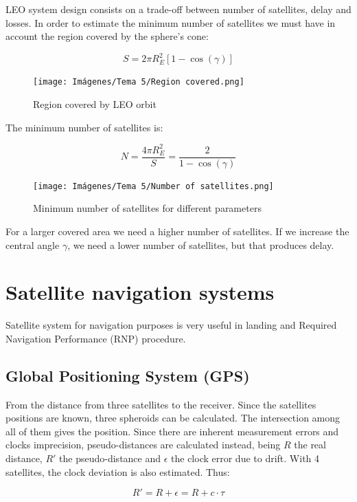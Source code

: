 \documentclass[
	12pt,
	twoside
]{book}
\begin{document}
LEO system design consists on a trade-off between number of satellites, delay and losses. In order to estimate the minimum number of satellites we must have in account the region covered by the sphere’s cone:

$$
	S = 2 \pi R_{E}^2 \left[ 1 - \cos(\gamma) \right]
$$

\begin{figure}[H]
	\centering
	\texttt{[image: Imágenes/Tema 5/Region covered.png]}
	\caption{
		\label{fig:unit5_region_LEO}
		Region covered by LEO orbit
	}
\end{figure}

The minimum number of satellites is:

$$
	N = \frac {4 \pi R_{E}^2} {S} = \frac {2} {1 - \cos(\gamma)}
$$

\begin{figure}[H]
	\centering
	\texttt{[image: Imágenes/Tema 5/Number of satellites.png]}
	\caption{
		\label{fig:unit5_number_sat_LEO}
		Minimum number of satellites for different parameters
	}
\end{figure}

For a larger covered area we need a higher number of satellites. If we increase the central angle $\gamma$, we need a lower number of satellites, but that produces delay.

\section{Satellite navigation systems}

Satellite system for navigation purposes is very useful in landing and Required Navigation Performance (RNP) procedure.

\subsection{Global Positioning System (GPS)}

From the distance from three satellites to the receiver. Since the satellites positions are known, three spheroids can be calculated. The intersection among all of them gives the position. Since there are inherent measurement errors and clocks imprecision, pseudo-distances are calculated instead, being $R$ the real distance, $R'$ the pseudo-distance and $\epsilon$ the clock error due to drift. With 4 satellites, the clock deviation is also estimated. Thus:

$$
	R' = R + \epsilon = R + c \cdot \tau
$$
\end{document}
